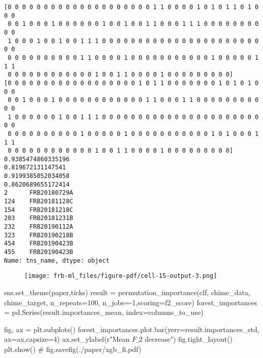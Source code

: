 \documentclass[
  letterpaper,
  DIV=11,
  numbers=noendperiod]{scrartcl}
\newenvironment{Shaded}{\begin{snugshade}}{\end{snugshade}}
\newcommand{\CommentTok}[1]{\textcolor[rgb]{0.37,0.37,0.37}{#1}}
\newcommand{\DecValTok}[1]{\textcolor[rgb]{0.68,0.00,0.00}{#1}}
\newcommand{\NormalTok}[1]{\textcolor[rgb]{0.00,0.23,0.31}{#1}}
\newcommand{\OperatorTok}[1]{\textcolor[rgb]{0.37,0.37,0.37}{#1}}
\newcommand{\StringTok}[1]{\textcolor[rgb]{0.13,0.47,0.30}{#1}}
\newcommand{\VerbatimStringTok}[1]{\textcolor[rgb]{0.13,0.47,0.30}{#1}}
\begin{document}
\begin{verbatim}
[0 0 0 0 0 0 0 0 0 0 0 0 0 0 0 0 0 0 0 0 1 1 0 0 0 0 1 0 1 0 1 1 0 1 0 0 0
 0 0 1 0 0 0 1 0 0 0 0 0 0 1 0 0 1 0 0 1 1 0 0 0 1 1 1 0 0 0 0 0 0 0 0 0 0
 1 0 0 0 1 0 0 1 0 0 1 1 1 0 0 0 0 0 0 0 0 0 0 0 0 0 0 0 0 0 0 0 0 0 0 0 0
 0 0 0 0 0 0 0 0 0 0 1 1 0 0 0 0 1 0 0 0 0 0 0 0 0 0 0 0 1 0 0 0 0 0 1 1 1
 0 0 0 0 0 0 0 0 0 0 0 0 1 0 0 1 1 0 0 0 0 1 0 0 0 0 0 0 0 0 0]
[0 0 0 0 0 0 0 0 0 0 0 0 0 0 0 0 0 0 1 0 1 1 0 0 0 0 0 0 0 1 0 1 0 1 0 0 0
 0 0 1 0 0 0 1 0 0 0 0 0 0 0 0 0 0 0 0 1 1 0 0 0 1 1 0 0 0 0 0 0 0 0 0 0 0
 1 0 0 0 0 0 0 1 0 0 1 1 1 0 0 0 0 0 0 0 0 0 0 0 0 0 0 0 0 0 0 0 0 0 0 0 0
 0 0 0 0 0 0 0 0 0 0 1 0 0 0 0 0 1 0 0 0 0 0 0 0 0 0 0 0 1 0 1 0 0 0 1 1 1
 0 0 0 0 0 0 0 0 0 0 0 0 1 0 0 1 1 0 0 0 0 1 0 0 0 0 0 0 0 0 0]
0.9385474860335196
0.819672131147541
0.9199385052034058
0.8620689655172414
2      FRB20180729A
124    FRB20181128C
154    FRB20181218C
203    FRB20181231B
232    FRB20190112A
323    FRB20190218B
454    FRB20190423B
455    FRB20190423B
Name: tns_name, dtype: object
\end{verbatim}

\begin{figure}[H]

{\centering \texttt{[image: frb-ml\_files/figure-pdf/cell-15-output-3.png]}

}

\end{figure}

\begin{Shaded}
\begin{Highlighting}[]
\NormalTok{sns.set\_theme(}\StringTok{\textquotesingle{}paper\textquotesingle{}}\NormalTok{,}\StringTok{\textquotesingle{}ticks\textquotesingle{}}\NormalTok{)}
\NormalTok{result }\OperatorTok{=}\NormalTok{ permutation\_importance(clf, chime\_data, chime\_target, n\_repeats}\OperatorTok{=}\DecValTok{100}\NormalTok{, n\_jobs}\OperatorTok{={-}}\DecValTok{1}\NormalTok{,scoring}\OperatorTok{=}\NormalTok{f2\_score)}
\NormalTok{forest\_importances }\OperatorTok{=}\NormalTok{ pd.Series(result.importances\_mean, index}\OperatorTok{=}\NormalTok{columns\_to\_use)}

\NormalTok{fig, ax }\OperatorTok{=}\NormalTok{ plt.subplots()}
\NormalTok{forest\_importances.plot.bar(yerr}\OperatorTok{=}\NormalTok{result.importances\_std, ax}\OperatorTok{=}\NormalTok{ax,capsize}\OperatorTok{=}\DecValTok{4}\NormalTok{)}
\NormalTok{ax.set\_ylabel(}\VerbatimStringTok{r"Mean $F\_2$ decrease"}\NormalTok{)}
\NormalTok{fig.tight\_layout()}
\NormalTok{plt.show()}
\CommentTok{\# fig.savefig(\textquotesingle{}./paper/xgb\_fi.pdf\textquotesingle{})}
\end{Highlighting}
\end{Shaded}
\end{document}
